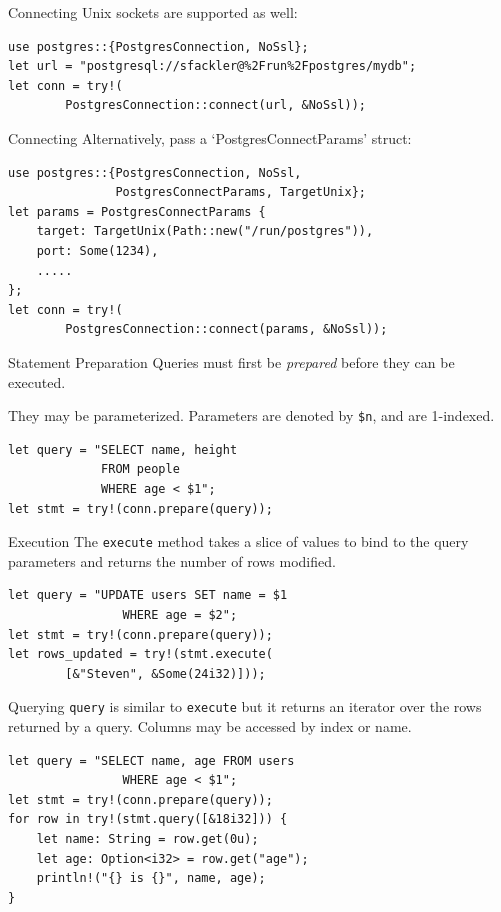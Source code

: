 \documentclass{beamer}
\begin{document}
\begin{frame}[fragile]{Connecting}
	Unix sockets are supported as well:
	\begin{verbatim}
use postgres::{PostgresConnection, NoSsl};
let url = "postgresql://sfackler@%2Frun%2Fpostgres/mydb";
let conn = try!(
        PostgresConnection::connect(url, &NoSsl));
	\end{verbatim}	
\end{frame}

\begin{frame}[fragile]{Connecting}
	Alternatively, pass a `PostgresConnectParams' struct:
	\begin{verbatim}
use postgres::{PostgresConnection, NoSsl,
               PostgresConnectParams, TargetUnix};
let params = PostgresConnectParams {
    target: TargetUnix(Path::new("/run/postgres")),
    port: Some(1234),
    .....
};
let conn = try!(
        PostgresConnection::connect(params, &NoSsl));
	\end{verbatim}
\end{frame}

\begin{frame}[fragile]{Statement Preparation}
    Queries must first be \emph{prepared} before they can be executed.

    They may be parameterized. Parameters are denoted by \verb!$n!, and are
    1-indexed.
    \begin{verbatim}
let query = "SELECT name, height
             FROM people
             WHERE age < $1";
let stmt = try!(conn.prepare(query));
    \end{verbatim}
\end{frame}

\begin{frame}[fragile]{Execution}
    The \verb!execute! method takes a slice of values to bind to the query
    parameters and returns the number of rows modified.
    \begin{verbatim}
let query = "UPDATE users SET name = $1
                WHERE age = $2";
let stmt = try!(conn.prepare(query));
let rows_updated = try!(stmt.execute(
        [&"Steven", &Some(24i32)]));
    \end{verbatim}
\end{frame}

\begin{frame}[fragile]{Querying}
    \verb!query! is similar to \verb!execute! but it returns an iterator over
    the rows returned by a query. Columns may be accessed by index or name.
    \begin{verbatim}
let query = "SELECT name, age FROM users
                WHERE age < $1";
let stmt = try!(conn.prepare(query));
for row in try!(stmt.query([&18i32])) {
    let name: String = row.get(0u);
    let age: Option<i32> = row.get("age");
    println!("{} is {}", name, age);
}
    \end{verbatim}
\end{frame}
\end{document}
